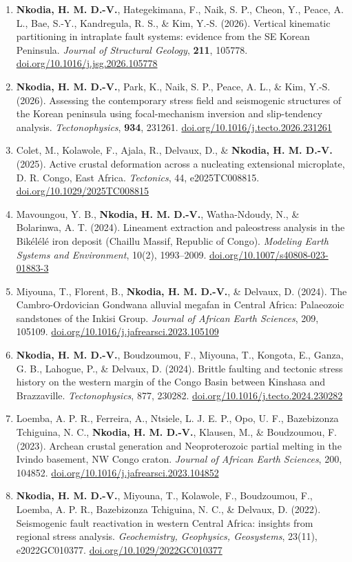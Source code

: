 \documentclass[11pt,a4paper]{article}
\newcommand{\hy}{\textbf{Nkodia, H. M. D.-V.}}
\newcommand{\doilink}[1]{\href{https://doi.org/#1}{doi.org/#1}}
\begin{document}
\begin{enumerate}
\item \hy, Hategekimana, F., Naik, S. P., Cheon, Y., Peace, A. L., Bae, S.-Y., Kandregula, R. S., \& Kim, Y.-S. (2026). Vertical kinematic partitioning in intraplate fault systems: evidence from the SE Korean Peninsula. \textit{Journal of Structural Geology}, \textbf{211}, 105778. \doilink{10.1016/j.jsg.2026.105778}
\item \hy, Park, K., Naik, S. P., Peace, A. L., \& Kim, Y.-S. (2026). Assessing the contemporary stress field and seismogenic structures of the Korean peninsula using focal-mechanism inversion and slip-tendency analysis. \textit{Tectonophysics}, \textbf{934}, 231261. \doilink{10.1016/j.tecto.2026.231261}
\item Colet, M., Kolawole, F., Ajala, R., Delvaux, D., \& \hy (2025). Active crustal deformation across a nucleating extensional microplate, D. R. Congo, East Africa. \textit{Tectonics}, 44, e2025TC008815. \doilink{10.1029/2025TC008815}
\item Mavoungou, Y. B., \hy, Watha-Ndoudy, N., \& Bolarinwa, A. T. (2024). Lineament extraction and paleostress analysis in the Bikélélé iron deposit (Chaillu Massif, Republic of Congo). \textit{Modeling Earth Systems and Environment}, 10(2), 1993--2009. \doilink{10.1007/s40808-023-01883-3}
\item Miyouna, T., Florent, B., \hy, \& Delvaux, D. (2024). The Cambro-Ordovician Gondwana alluvial megafan in Central Africa: Palaeozoic sandstones of the Inkisi Group. \textit{Journal of African Earth Sciences}, 209, 105109. \doilink{10.1016/j.jafrearsci.2023.105109}
\item \hy, Boudzoumou, F., Miyouna, T., Kongota, E., Ganza, G. B., Lahogue, P., \& Delvaux, D. (2024). Brittle faulting and tectonic stress history on the western margin of the Congo Basin between Kinshasa and Brazzaville. \textit{Tectonophysics}, 877, 230282. \doilink{10.1016/j.tecto.2024.230282}
\item Loemba, A. P. R., Ferreira, A., Ntsiele, L. J. E. P., Opo, U. F., Bazebizonza Tchiguina, N. C., \hy, Klausen, M., \& Boudzoumou, F. (2023). Archean crustal generation and Neoproterozoic partial melting in the Ivindo basement, NW Congo craton. \textit{Journal of African Earth Sciences}, 200, 104852. \doilink{10.1016/j.jafrearsci.2023.104852}
\item \hy, Miyouna, T., Kolawole, F., Boudzoumou, F., Loemba, A. P. R., Bazebizonza Tchiguina, N. C., \& Delvaux, D. (2022). Seismogenic fault reactivation in western Central Africa: insights from regional stress analysis. \textit{Geochemistry, Geophysics, Geosystems}, 23(11), e2022GC010377. \doilink{10.1029/2022GC010377}

\end{enumerate}
\end{document}
